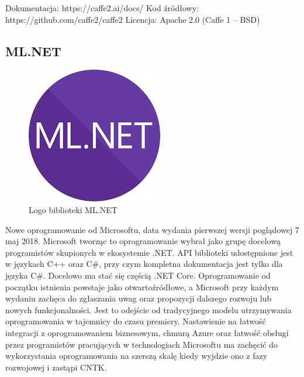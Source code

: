 \documentclass[12pt,a4paper,twoside,titlepage,openright]{book}
\begin{document}
\noindent
\newline
Dokumentacja: https://caffe2.ai/docs/
\newline
Kod źródłowy: https://github.com/caffe2/caffe2
\newline
Licencja: Apache 2.0 (Caffe 1 -- BSD)


\subsection{ML.NET}
\begin{figure}[h]
	\centering
			\includegraphics[resolution=100, scale=1]{ML_NET.png}
		\caption{Logo biblioteki ML.NET}
\end{figure}
Nowe oprogramowanie od Microsoftu, data wydania pierwszej wersji poglądowej 7 maj 2018. Microsoft tworząc to oprogramowanie wybrał jako grupę docelową programistów skupionych w ekosystemie .NET. API biblioteki udostępnione jest w językach C++ oraz C\#, przy czym kompletna dokumentacja jest tylko dla języka C\#. Docelowo ma stać się częścią .NET Core. Oprogramowanie od początku istnienia powstaje jako otwartoźródłowe, a Microsoft przy każdym wydaniu zachęca do zgłaszania uwag oraz propozycji dalszego rozwoju lub nowych funkcjonalności. Jest to odejście od tradycyjnego modelu utrzymywania oprogramowania w tajemnicy do czasu premiery. Nastawienie na łatwość integracji z oprogramowaniem biznesowym, chmurą Azure oraz łatwość obsługi przez programistów pracujących w technologiach Microsoftu ma zachęcić do wykorzystania oprogramowania na szerszą skalę kiedy wyjdzie ono z fazy rozwojowej i zastąpi CNTK.
\end{document}
